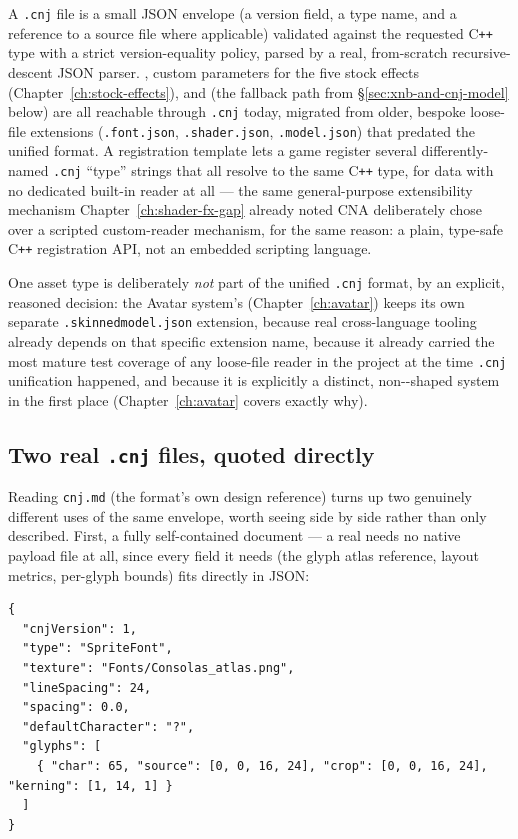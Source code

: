 A \texttt{.cnj} file is a small JSON envelope (a version field, a type name, and a reference
to a source file where applicable) validated against the requested C\texttt{++} type with a
strict version-equality policy, parsed by a real, from-scratch recursive-descent JSON parser.
, custom  parameters for the five stock effects
(Chapter~\ref{ch:stock-effects}), and  (the fallback path from
\S\ref{sec:xnb-and-cnj-model} below) are all reachable through \texttt{.cnj} today, migrated
from older, bespoke loose-file extensions (\texttt{.font.json}, \texttt{.shader.json},
\texttt{.model.json}) that predated the unified format. A registration template lets a game
register several differently-named \texttt{.cnj} ``type'' strings that all resolve to the
same C\texttt{++} type, for data with no dedicated built-in reader at all --- the same
general-purpose extensibility mechanism Chapter~\ref{ch:shader-fx-gap} already noted CNA
deliberately chose over a scripted custom-reader mechanism, for the same reason: a plain,
type-safe C\texttt{++} registration API, not an embedded scripting language.

One asset type is deliberately \emph{not} part of the unified \texttt{.cnj} format, by an
explicit, reasoned decision: the Avatar system's 
(Chapter~\ref{ch:avatar}) keeps its own separate \texttt{.skinnedmodel.json} extension, because
real cross-language tooling already depends on that specific extension name, because it already
carried the most mature test coverage of any loose-file reader in the project at the time
\texttt{.cnj} unification happened, and because it is explicitly a distinct,
non--shaped system in the first place (Chapter~\ref{ch:avatar} covers exactly
why).

\subsection{Two real \texttt{.cnj} files, quoted directly}

Reading \texttt{cnj.md} (the format's own design reference) turns up two genuinely different
uses of the same envelope, worth seeing side by side rather than only described. First, a
fully self-contained document --- a real  needs no native payload file at
all, since every field it needs (the glyph atlas reference, layout metrics, per-glyph bounds)
fits directly in JSON:

\begin{lstlisting}
{
  "cnjVersion": 1,
  "type": "SpriteFont",
  "texture": "Fonts/Consolas_atlas.png",
  "lineSpacing": 24,
  "spacing": 0.0,
  "defaultCharacter": "?",
  "glyphs": [
    { "char": 65, "source": [0, 0, 16, 24], "crop": [0, 0, 16, 24], "kerning": [1, 14, 1] }
  ]
}
\end{lstlisting}

